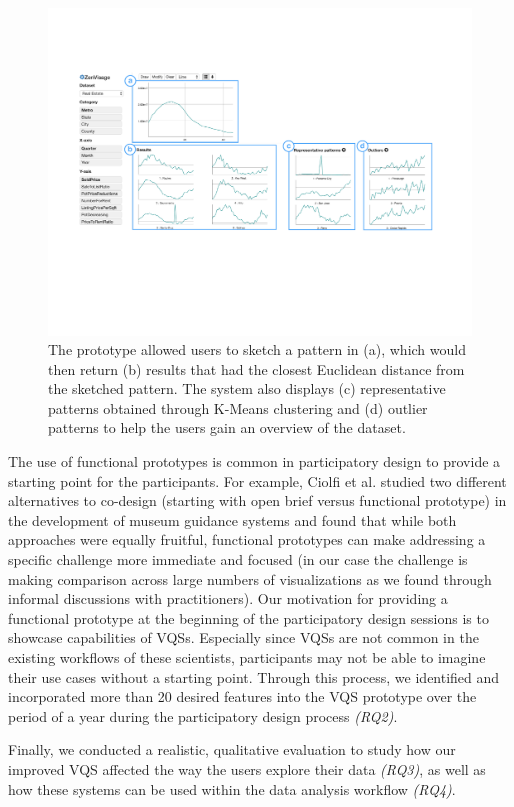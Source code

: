 	\begin{figure}[ht!]
	\centering
	\includegraphics[width=\linewidth]{figures/oldZV_nozql.pdf}
	\caption{The \zv prototype allowed users to sketch a pattern in (a), which would then return (b) results that had the closest Euclidean distance from the sketched pattern. The system also displays (c) representative patterns obtained through K-Means clustering and (d) outlier patterns to help the users gain an overview of the dataset.}
	\label{oldZV}
	\end{figure}
\par The use of functional prototypes is common in participatory design to provide a starting point for the participants. For example, Ciolfi et al.\cite{Ciolfi2016} studied two different alternatives to co-design (starting with open brief versus functional prototype) in the development of museum guidance systems and found that while both approaches were equally fruitful, functional prototypes can make addressing a specific challenge more immediate and focused (in our case the challenge is making comparison across large numbers of visualizations as we found through informal discussions with practitioners). Our motivation for providing a functional prototype at the beginning of the participatory design sessions is to showcase capabilities of VQSs. Especially since VQSs are not common in the existing workflows of these scientists, participants may not be able to imagine their use cases without a starting point. Through this process, we identified and incorporated more than 20 desired features into the VQS prototype over the period of a year during the participatory design process {\em (RQ2)}. 
\par Finally, we conducted a realistic, qualitative evaluation to study how our improved VQS affected the way the users explore their data {\em (RQ3)}, as well as how these systems can be used within the data analysis workflow {\em (RQ4)}. 